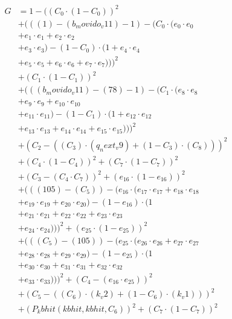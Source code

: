 \documentclass[10pt, a4paper]{article}
\begin{document}
\begin{small}
\begin{align*}
G &= 1 - ((C_{0} \cdot (1 - C_{0}))^{2} \\
& + (((1) - (b_movido_v11) - 1) - (C_{0} \cdot (e_{0} \cdot e_{0} \\
& + e_{1} \cdot e_{1} + e_{2} \cdot e_{2} \\
& + e_{3} \cdot e_{3}) - (1 - C_{0}) \cdot (1 + e_{4} \cdot e_{4} \\
& + e_{5} \cdot e_{5} + e_{6} \cdot e_{6} + e_{7} \cdot e_{7})))^{2} \\
& + (C_{1} \cdot (1 - C_{1}))^{2} \\
& + (((b_movido_v11) - (78) - 1) - (C_{1} \cdot (e_{8} \cdot e_{8} \\
& + e_{9} \cdot e_{9} + e_{10} \cdot e_{10} \\
& + e_{11} \cdot e_{11}) - (1 - C_{1}) \cdot (1 + e_{12} \cdot e_{12} \\
& + e_{13} \cdot e_{13} + e_{14} \cdot e_{14} + e_{15} \cdot e_{15})))^{2} \\
& + (C_{2} - ((C_{3})  \cdot  (q_next_v9) + (1 - C_{3})  \cdot  (C_{8})))^{2} \\
& + (C_{4} \cdot (1 - C_{4}))^{2} + (C_{7} \cdot (1 - C_{7}))^{2} \\
& + (C_{3} - (C_{4} \cdot C_{7}))^{2} + (e_{16} \cdot (1 - e_{16}))^{2} \\
& + (((105) - (C_{5})) - (e_{16} \cdot (e_{17} \cdot e_{17} + e_{18} \cdot e_{18} \\
& + e_{19} \cdot e_{19} + e_{20} \cdot e_{20}) - (1 - e_{16}) \cdot (1 \\
& + e_{21} \cdot e_{21} + e_{22} \cdot e_{22} + e_{23} \cdot e_{23} \\
& + e_{24} \cdot e_{24})))^{2} + (e_{25} \cdot (1 - e_{25}))^{2} \\
& + (((C_{5}) - (105)) - (e_{25} \cdot (e_{26} \cdot e_{26} + e_{27} \cdot e_{27} \\
& + e_{28} \cdot e_{28} + e_{29} \cdot e_{29}) - (1 - e_{25}) \cdot (1 \\
& + e_{30} \cdot e_{30} + e_{31} \cdot e_{31} + e_{32} \cdot e_{32} \\
& + e_{33} \cdot e_{33})))^{2} + (C_{4} - (e_{16} \cdot e_{25}))^{2} \\
& + (C_{5} - ((C_{6})  \cdot  (k_v2) + (1 - C_{6})  \cdot  (k_v1)))^{2} \\
& + (P_kbhit(kbhit, kbhit, C_{6}))^{2} + (C_{7} \cdot (1 - C_{7}))^{2} \\

\end{align*}
\end{small}
\end{document}

